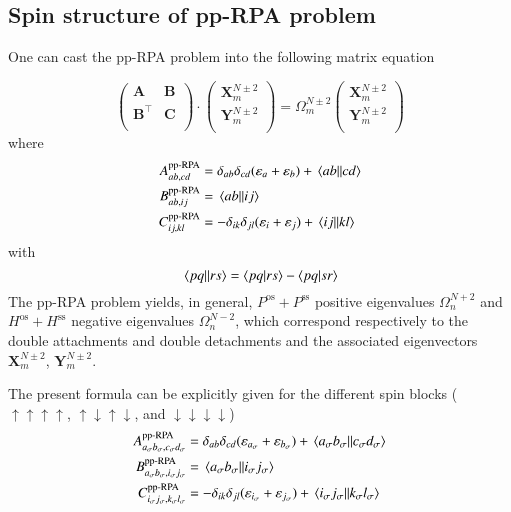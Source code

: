 \documentclass[aip,jcp,reprint,noshowkeys,superscriptaddress]{revtex4-1}
\newcommand{\ppRPA}{\text{pp-RPA}}
\newcommand{\e}[1]{\eps_{#1}}
\newcommand{\Om}[2]{\Omega_{#1}^{#2}}
\newcommand{\bA}[2]{\mathbf{A}_{#1}^{#2}}
\newcommand{\bB}[2]{\mathbf{B}_{#1}^{#2}}
\newcommand{\bC}[2]{\mathbf{C}_{#1}^{#2}}
\newcommand{\bX}[2]{\mathbf{X}_{#1}^{#2}}
\newcommand{\bY}[2]{\mathbf{Y}_{#1}^{#2}}
\newcommand{\eps}{\varepsilon}
\newcommand{\sig}{\sigma}
\newcommand{\up}{\uparrow}
\newcommand{\dw}{\downarrow}
\newcommand{\ssp}{\text{ss}}
\newcommand{\osp}{\text{os}}
\begin{document}
\subsection{Spin structure of pp-RPA problem}
One can cast the pp-RPA problem into the following matrix equation 

\begin{equation}
\label{eq:LR-RPA}
	\begin{pmatrix}
		\bA{}{}				&	\bB{}{}	\\
		\bB{}{\intercal}	&	\bC{}{}	\\
	\end{pmatrix}
	\cdot
	\begin{pmatrix}
		\bX{m}{N\pm2}	\\
		\bY{m}{N\pm2}	\\
	\end{pmatrix}
	=
	\Om{m}{N\pm2}
	\begin{pmatrix}
		\bX{m}{N\pm2}	\\
		\bY{m}{N\pm2}	\\
	\end{pmatrix}
\end{equation}
where
\begin{subequations}
\begin{align}
	A_{ab,cd}^{\ppRPA} & = \delta_{ab} \delta_{cd} (\e{a} + \e{b}) + \mel{ab}{}{cd}
	\\ 
	B_{ab,ij}^{\ppRPA} & = \mel{ab}{}{ij}
	\\ 
	C_{ij,kl}^{\ppRPA} & = - \delta_{ik} \delta_{jl} (\e{i} + \e{j}) +\mel{ij}{}{kl}
\end{align}
\end{subequations}
with
\begin{equation}
	\mel{pq}{}{rs} = \braket{pq}{rs} - \braket{pq}{sr}
\end{equation}
The pp-RPA problem yields, in general, $P^{\osp} + P^{\ssp}$ positive eigenvalues $\Om{n}{N+2}$ and $H^{\osp} + H^{\ssp}$ negative eigenvalues $\Om{n}{N-2}$, which correspond respectively to the double attachments and double detachments and the associated eigenvectors $\bX{m}{N\pm2}$, $\bY{m}{N\pm2}$.

The present formula can be explicitly given for the different spin blocks ($\up\up\up\up$, $\up\dw\up\dw$, and $\dw\dw\dw\dw$)
\begin{subequations}
\begin{align}
	A_{a_\sig b_\sig,c_\sig d_\sig}^{\ppRPA} & = \delta_{ab} \delta_{cd} (\e{a_\sig} + \e{b_\sig}) + \mel{a_\sig b_\sig}{}{c_\sig d_\sig}
	\\ 
	B_{a_\sig b_\sig,i_\sig j_\sig}^{\ppRPA} & = \mel{a_\sig b_\sig }{}{i_\sig j_\sig}
	\\ 
	C_{i_\sig j_\sig,k_\sig l_\sig}^{\ppRPA} & = - \delta_{ik} \delta_{jl} (\e{i_\sig} + \e{j_\sig}) + \mel{i_\sig j_\sig}{}{k_\sig l_\sig}
\end{align}
\end{subequations}
\end{document}
